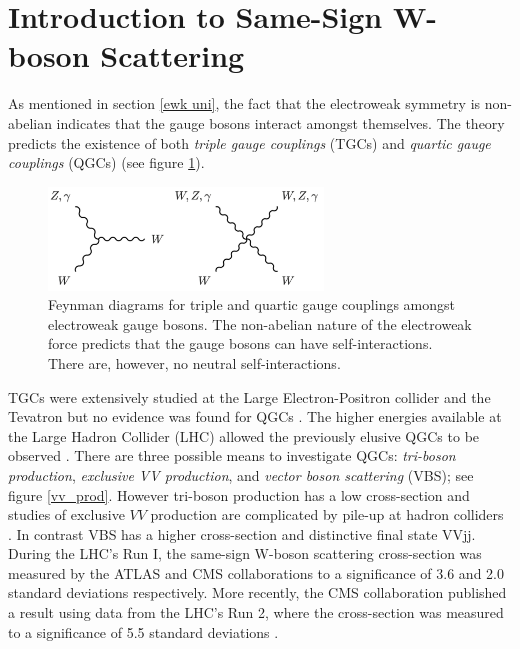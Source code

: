 \section{Introduction to Same-Sign W-boson Scattering}
\label{ssWW_intro}
As mentioned in section \ref{ewk uni}, the fact that the electroweak symmetry is non-abelian indicates that the gauge bosons interact amongst themselves. The theory predicts the existence of both \emph{triple gauge couplings} (TGCs) and \emph{quartic gauge couplings} (QGCs) (see figure \ref{tgcs and qgcs}).

\begin{figure}
\centering
\includegraphics[width=0.65\textwidth]{images/ssWW/vb_self_int.png}
\caption{Feynman diagrams for triple and quartic gauge couplings amongst electroweak gauge bosons. The non-abelian nature of the electroweak force predicts that the gauge bosons can have self-interactions. There are, however, no neutral self-interactions.}
\label{tgcs and qgcs}
\end{figure}

TGCs were extensively studied at the Large Electron-Positron collider \cite{LEP_tgc1,LEP_tgc2,LEP_tgc3,LEP_tgc/qgc2} and the Tevatron \cite{Tevatron_tgc1,Tevatron_tgc2,Tevatron_tgc3} but no evidence was found for QGCs \cite{LEP_tgc/qgc2,LEP_qgc2,LEP_qgc1,Tevatron_qgc2}. The higher energies available at the Large Hadron Collider (LHC) allowed the previously elusive QGCs to be observed \cite{qgc_lhc1,qgc_lhc2,qgc_lhc3}. There are three possible means to investigate QGCs: \textit{tri-boson production}, \textit{exclusive VV production}, and \textit{vector boson scattering} (VBS); see figure \ref{vv_prod}. However tri-boson production has a low cross-section \cite{triboson1,triboson2} and studies of exclusive $VV$ production are complicated by pile-up at hadron colliders \cite{exclusive1,exclusive2}. In contrast VBS has a higher cross-section and distinctive final state VVjj. During the LHC's Run I, the same-sign W-boson scattering cross-section was measured by the ATLAS and CMS collaborations to a significance of 3.6 \cite{ssWW} and 2.0 \cite{ssWW_CMS} standard deviations respectively. More recently, the CMS collaboration published a result using data from the LHC's Run 2, where the cross-section was measured to a significance of 5.5 standard deviations \cite{ssWW_CMS_Run2}.

